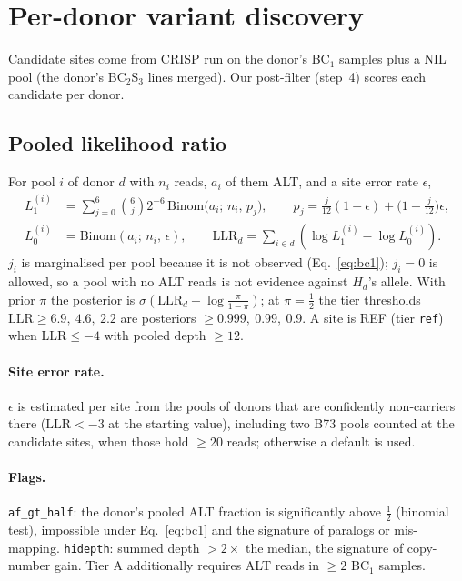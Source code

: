 \documentclass[11pt]{article}
\newcommand{\Bin}{\mathrm{Binom}}
\newcommand{\LLR}{\mathrm{LLR}}
\newcommand{\Hd}{H_d}
\newcommand{\code}[1]{\texttt{#1}}
\begin{document}
\section{Per-donor variant discovery}
\label{sec:discovery}

Candidate sites come from CRISP \citep{bansal2010crisp} run on the donor's BC$_1$ samples plus a NIL pool (the donor's BC$_2$S$_3$ lines
merged). Our post-filter (step~4) scores each candidate per donor.

\subsection{Pooled likelihood ratio}
For pool $i$ of donor $d$ with $n_i$ reads, $a_i$ of them ALT, and a site error rate $\epsilon$,
\begin{align}
L_1^{(i)} &= \sum_{j=0}^{6}\binom{6}{j}2^{-6}\,\Bin\!\big(a_i;\,n_i,\,p_j\big),\qquad p_j=\tfrac{j}{12}(1-\epsilon)+\big(1-\tfrac{j}{12}\big)\epsilon,\\
L_0^{(i)} &= \Bin(a_i;\,n_i,\,\epsilon),\qquad
\LLR_d=\sum_{i\in d}\left(\log L_1^{(i)}-\log L_0^{(i)}\right).
\label{eq:llr}
\end{align}
$j_i$ is marginalised per pool because it is not observed (Eq.~\eqref{eq:bc1}); $j_i=0$ is allowed, so a pool with no ALT reads is not evidence
against $\Hd$'s allele. With prior $\pi$ the posterior is $\sigma(\LLR_d+\log\frac{\pi}{1-\pi})$; at $\pi=\tfrac12$ the tier thresholds
$\LLR\ge6.9,\ 4.6,\ 2.2$ are posteriors $\ge0.999,\ 0.99,\ 0.9$. A site is REF (tier \code{ref}) when $\LLR\le-4$ with pooled depth
$\ge12$.

\paragraph{Site error rate.} $\epsilon$ is estimated per site from the pools of donors that are confidently non-carriers there ($\LLR<-3$ at
the starting value), including two B73 pools counted at the candidate sites, when those hold $\ge20$ reads; otherwise a default is used.

\paragraph{Flags.} \code{af\_gt\_half}: the donor's pooled ALT fraction is significantly above $\tfrac12$ (binomial test), impossible under
Eq.~\eqref{eq:bc1} and the signature of paralogs or mis-mapping. \code{hidepth}: summed depth $>2\times$ the median, the signature of copy-number
gain. Tier A additionally requires ALT reads in $\ge2$ BC$_1$ samples.
\end{document}
